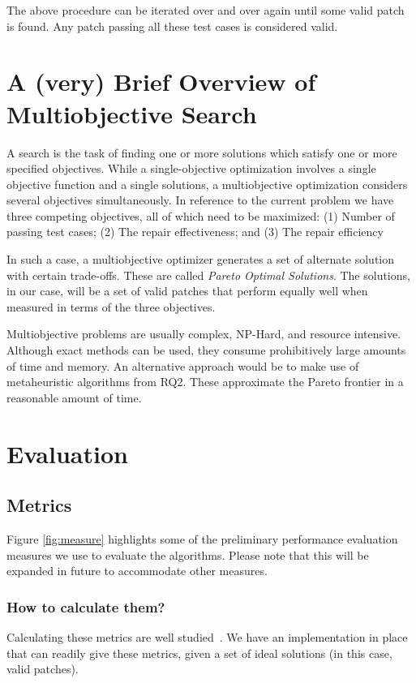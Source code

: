 \documentclass[9pt, compsoc, journal]{IEEEtran}
\begin{document}
The above procedure can be iterated over and over again until some valid patch is found. Any patch passing all these test cases is considered valid. 


\section{A (very) Brief Overview of Multiobjective Search}

A search is the task of finding one or more solutions which satisfy one or more specified objectives. While a single-objective optimization involves a single objective function and a single solutions, a multiobjective optimization considers several objectives simultaneously. In reference to the current problem we have three competing objectives, all of which need to be maximized: (1) Number of passing test cases; (2) The repair effectiveness; and (3) The repair efficiency 

In such a case, a multiobjective optimizer generates a set of alternate solution with certain trade-offs. These are called \textit{Pareto Optimal Solutions}. The solutions, in our case, will be a set of valid patches that perform equally well when measured in terms of the three objectives.

Multiobjective problems are usually complex, NP-Hard, and resource intensive. Although exact methods can be used, they consume prohibitively large amounts of time and memory. An alternative approach would be to make use of metaheuristic algorithms from RQ2. These approximate the Pareto frontier in a reasonable amount of time. 

\section{Evaluation}




\subsection{Metrics}
Figure \ref{fig:measure} highlights some of the preliminary performance evaluation measures we use to evaluate the algorithms. Please note that this will be expanded in future to accommodate other measures.

\subsubsection{How to calculate them?}
Calculating these metrics are well studied~\cite{deb2002fast, goel2010study}. We have an implementation in place that can readily give these metrics, given a set of ideal solutions (in this case, valid patches).
\end{document}

